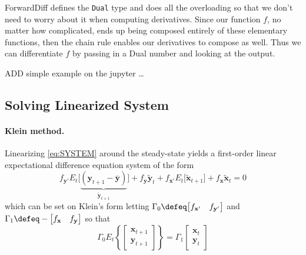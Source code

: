 \documentclass[a4paper,10pt]{article}  %
\begin{document}
ForwardDiff defines the \texttt{Dual} type and does all the overloading so that we don't need to
worry about it when computing derivatives.
Since our function $ f$, no matter how complicated, ends up being composed entirely of these elementary functions, then
the chain rule enables our derivatives to compose as well. Thus we can differentiate $f$
by passing in a Dual number and looking at the output.

ADD simple example on the jupyter \ldots

\subsection{Solving Linearized System} %
\label{sub:solving_linearized_system}


\paragraph{Klein method.}
Linearizing \eqref{eq:SYSTEM} around the steady-state yields a first-order linear expectational difference equation
system of the form
\begin{equation}
   \label{eq:linearized_equil_conditions}
   f_{ \mathbf{y}' } E_t \Big[ \underbrace{ ( \mathbf{y}_{t+1} -  \bar{\mathbf{y}}) }_{ \tilde{\mathbf{y}}_{t+1} } \Big] 
   + f_{ \mathbf{y} }   \tilde{\mathbf{y}}_t  
   + f_{ \mathbf{x}' }  E_t \Big[  \tilde{\mathbf{x}}_{t+1} \Big]
   + f_{ \mathbf{x} }   \tilde{\mathbf{x}}_{t}
   = 0
\end{equation}
which can be set on Klein's form letting $ \Gamma_0 \defeq \big[f_{ \mathbf{x}' } \quad f_{ \mathbf{y}' } \big] $  and
$ \Gamma_1 \defeq - \big[f_{ \mathbf{x} } \quad  f_{ \mathbf{y} } \big] $ so that
\begin{equation}
   \label{eq:klein}
   \Gamma_0
   E_t \left\{ 
         \begin{bmatrix}
            \mathbf{x}_{t+1} \\ \mathbf{y}_{t+1}
         \end{bmatrix}
      \right\} = 
   \Gamma_1
   \begin{bmatrix}
      \mathbf{x}_{t} \\ \mathbf{y}_t 
   \end{bmatrix}
\end{equation}
\end{document}
